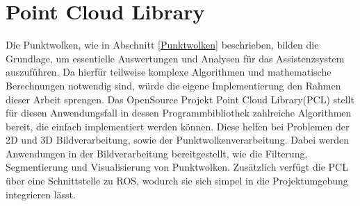 \section{Point Cloud Library}

Die Punktwolken, wie in Abschnitt \ref{Punktwolken} beschrieben, bilden die Grundlage, um essentielle Auswertungen und Analysen für das Assistenzsystem auszuführen. Da hierfür teilweise komplexe Algorithmen und mathematische Berechnungen notwendig sind, würde die eigene Implementierung den Rahmen dieser Arbeit sprengen. \newline
Das OpenSource Projekt Point Cloud Library(PCL) stellt für diesen Anwendungsfall in dessen Programmbibliothek zahlreiche Algorithmen bereit, die einfach implementiert werden können. Diese helfen bei Problemen der 2D und 3D Bildverarbeitung, sowie der Punktwolkenverarbeitung.\cite{pclGeneral} %
Dabei werden Anwendungen in der Bildverarbeitung bereitgestellt, wie die Filterung, Segmentierung und Visualisierung von Punktwolken. \newline
Zusätzlich verfügt die PCL über eine Schnittstelle zu ROS, wodurch sie sich simpel in die Projektumgebung integrieren lässt.